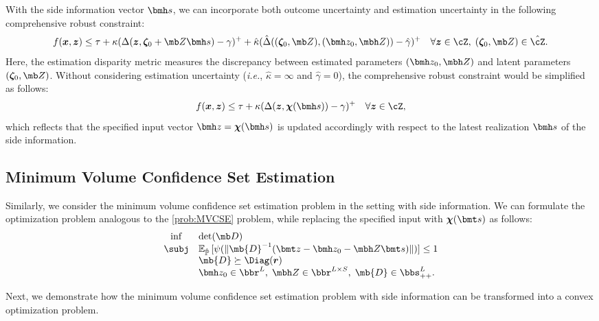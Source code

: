 \documentclass[opre, blindrev]{informs4}
\newcommand{\1}[1]{\mathds{1}{\left(#1\right)}}
\begin{document}
With the side information vector $\bmh s$, we can incorporate  both outcome uncertainty and estimation uncertainty in the following comprehensive robust constraint:
\[
f(\bm x,\bm z) \leq \tau + \kappa (\Delta({\bm z},\bm \zeta_0 + \mb Z \bmh s ) - \gamma)^+ + \hat \kappa (\hat \Delta((\bm \zeta_0, \mb Z),(\bmh z_0,\mbh Z)) - \hat \gamma)^+  ~~~\forall \bm z \in \cZ, \; (\bm \zeta_0,\mb Z) \in \hat \cZ.
\]
Here, the estimation disparity metric measures the discrepancy between estimated parameters $(\bmh z_0,\mbh Z)$ and latent parameters $(\bm \zeta_0,\mb Z)$.
Without considering estimation uncertainty (\textit{i.e.}, $\hat \kappa = \infty$ and $\hat \gamma =0$), the comprehensive robust constraint would be simplified as follows: 
\[
f(\bm x,\bm z) \leq \tau + \kappa (\Delta(\bm z, \bm \chi(\bmh s) ) - \gamma)^+  ~~~\forall \bm z \in \cZ,
\]
which reflects that the specified input vector $\bmh z= \bm \chi(\bmh s)$ is updated accordingly with respect to the latest realization $\bmh s$ of the side information. 

\subsection*{Minimum Volume Confidence Set Estimation }
Similarly, we consider the minimum volume confidence set estimation problem in the setting with side information. We can formulate the optimization problem analogous to the \ref{prob:MVCSE} problem, while replacing the specified input with $\bm \chi(\bmt s)$ as follows:
\begin{equation}
\label{prob:MVCSE_Side_Info}
\begin{array}{cll}
\inf & \det(\mb D) \\
\subj & \mathbb{E}_{\hat{\mathbb{P}}}\,[\psi(\|\mb{D}^{-1}( \bmt z - \bmh z_0 - \mbh Z \bmt s )\|)] \leq 1 \\
& \mb{D} \succeq \Diag(\bm r) \\
& \bmh z_0 \in \bbr^L, \; \mbh Z \in \bbr^{L \times S}, \; \mb{D} \in \bbs^{L}_{++}.
\end{array} 
\end{equation}

Next, we demonstrate how the minimum volume confidence set estimation problem with side information can be transformed into a convex optimization problem.
\end{document}
